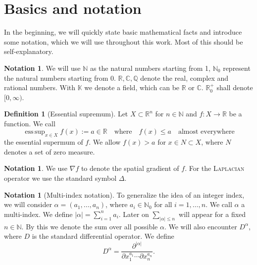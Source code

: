 \documentclass[12pt,a4paper,twoside, open=right]{scrreprt}
\theoremstyle{definition}
\newtheorem{defn}[auf]{Definition}
\newtheorem{notation}[auf]{Notation}
\theoremstyle{plain}
\DeclareMathOperator*{\esssup}{ess\,sup} %
\newcommand{\abs}[1]{\left\vert #1\right\vert}
\newcommand{\rr}{\mathbb{R}}
\newcommand{\cc}{\mathbb{C}}
\newcommand{\kk}{\mathbb{K}}
\newcommand{\nn}{\mathbb{N}}
\newcommand{\qq}{\mathbb{Q}}
\begin{document}
\section{Basics and notation}
In the beginning, we will quickly state basic mathematical facts and introduce some notation, which we will use throughout this work. Most of this should be self-explanatory.
\begin{notation}
    We will use $\nn$ as the natural numbers starting from 1, $\nn_0$ represent the natural numbers starting from 0. $\rr,\cc,\qq$ denote the real, complex and rational numbers. With $\kk$ we denote a field, which can be $\rr$ or $\cc$. $\rr^+_0$ shall denote $[0,\infty)$.
\end{notation} 
\begin{defn}[Essential supremum]
    Let $X\subset\rr^n$ for $n\in\nn$ and $f\colon X\to \rr$ be a function. 
    We call 
    \begin{equation}
        \esssup_{x\in X}f(x):=a\in\rr\quad\text{where}\quad f(x)\le a\quad\text{almost everywhere}
    \end{equation}
    the essential supermum of $f$. We allow $f(x)>a$ for $x\in N\subset X$, where $N$ denotes a set of zero measure.
\end{defn}
\begin{notation}
    We use $\nabla f$ to denote the spatial gradient of $f$. For the \textsc{Laplacian} operator we use the standard symbol $\Delta$. 
\end{notation}
\begin{notation}[Multi-index notation]
    To generalize the idea of an integer index, we will consider $\alpha=(a_1,\dotsc,a_n)$, where $a_i\in\nn_0$ for all $i=1,\dotsc,n$. We call $\alpha$ a multi-index. We define $\abs{\alpha}=\sum_{i=1}^na_i$. Later on $\sum_{\abs{\alpha}\le n}$ will appear for a fixed $n\in\nn$. By this we denote the sum over all possible $\alpha$. We will also encounter $D^\alpha$, where $D$ is the standard differential operator. We define \begin{equation}
        D^\alpha=\frac{\partial^{\abs{\alpha}}}{\partial x_1^{a_1}\dotsb\partial x_n^{a_n}}.
    \end{equation}
\end{notation}
\end{document}
